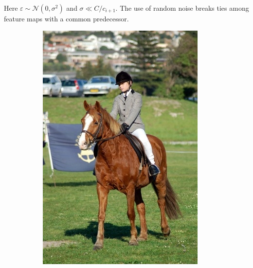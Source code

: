 \documentclass{article} %
\def\N{\mathcal N}
\begin{document}
Here $\varepsilon \sim \N(0,\sigma^2)$ and $\sigma \ll C / c_{i+1}$.
The use of random noise breaks ties among feature maps with a common predecessor.



\begin{figure}[t]
    \centering
  \begin{subfigure}[b]{0.19\linewidth}
    \includegraphics[width=\textwidth]{figs/ab/img/2007_005331}
  \end{subfigure}
  \begin{subfigure}[b]{0.19\linewidth}

\end{subfigure}
\end{figure}
\end{document}
